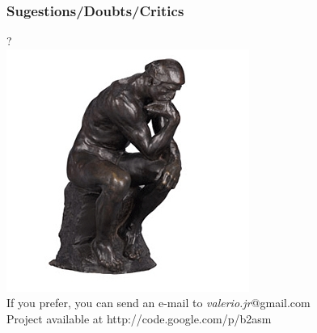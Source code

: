 \begin{frame}
  \frametitle{Sugestions/Doubts/Critics }
  	\begin{center}
    {\huge ?}\\
    \includegraphics[width=.5\textwidth]{figures/rodin.png}\\
    \large{ If you prefer, you can send an e-mail to 
    \textcolor{blue!70!black}{\textit{valerio.jr}}@gmail.com \\
    Project available at http://code.google.com/p/b2asm
    }
	\end{center}
    
\end{frame}